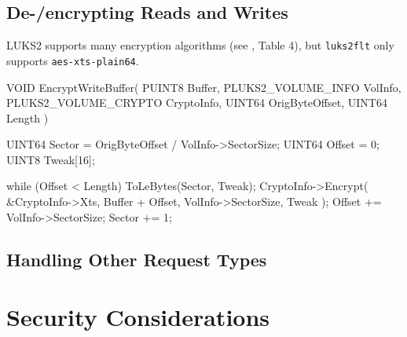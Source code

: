 
\subsection{De-/encrypting Reads and Writes}
\label{chap:ourapproach.final.de_encrypting}


LUKS2 supports many encryption algorithms (see \cite{Broz2018}, Table 4), but \texttt{luks2flt} only supports \texttt{aes-xts-plain64}.

\begin{ccode}
VOID
EncryptWriteBuffer(
    PUINT8 Buffer,
    PLUKS2_VOLUME_INFO VolInfo,
    PLUKS2_VOLUME_CRYPTO CryptoInfo,
    UINT64 OrigByteOffset,
    UINT64 Length
)
{
    UINT64 Sector = OrigByteOffset / VolInfo->SectorSize;
    UINT64 Offset = 0;
    UINT8 Tweak[16];

    while (Offset < Length) {
        ToLeBytes(Sector, Tweak);
        CryptoInfo->Encrypt(
            &CryptoInfo->Xts, Buffer + Offset,
            VolInfo->SectorSize, Tweak
        );
        Offset += VolInfo->SectorSize;
        Sector += 1;
    }
}
\end{ccode}

\subsection{Handling Other Request Types}
\label{chap:ourapproach.final.otherrequests}

\section{Security Considerations}
\label{chap:ourapproach.security}






